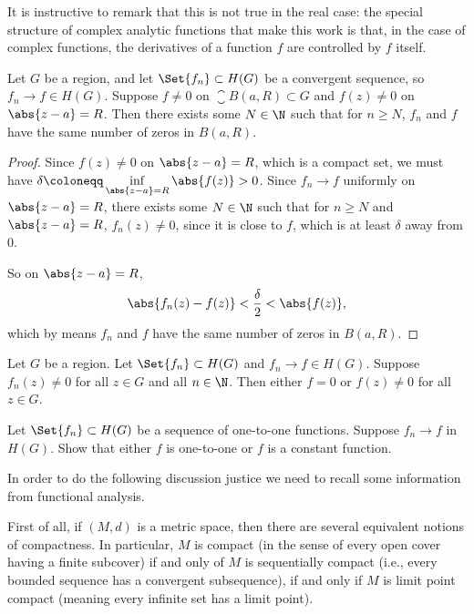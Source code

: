 It is instructive to remark that this is not true in the real case: the special structure of complex analytic functions that make this work is that, in the case of complex functions, the derivatives of a function $f$ are controlled by $f$ itself.

\begin{theorem}\label{thm7.7}
	Let $G$ be a region, and let $\Set{f_n} \subset H(G)$ be a convergent sequence, so $f_n \to f \in H(G)$.
	Suppose $f \neq 0$ on $\closure{B(a, R)} \subset G$ and $f(z) \neq 0$ on $\abs{z - a} = R$.
	Then there exists some $N \in \N$ such that for $n \geq N$, $f_n$ and $f$ have the same number of zeros in $B(a, R)$.
\end{theorem}

\begin{proof}
	Since $f(z) \neq 0$ on $\abs{z - a} = R$, which is a compact set, we must have $\delta \coloneqq \inf\limits_{\abs{z - a} = R} \abs{f(z)} > 0$.
	Since $f_n \to f$ uniformly on $\abs{z - a} = R$, there exists some $N \in \N$ such that for $n \geq N$ and $\abs{z - a} = R$, $f_n(z) \neq 0$, since it is close to $f$, which is at least $\delta$ away from $0$.

	So on $\abs{z - a} = R$,
	\[
		\abs{f_n(z) - f(z)} < \frac{\delta}{2} < \abs{f(z)},
	\]
	which by  means $f_n$ and $f$ have the same number of zeros in $B(a, R)$.
\end{proof}

\begin{corollary}\label{cor7.8}
	Let $G$ be a region.
	Let $\Set{f_n} \subset H(G)$ and $f_n \to f \in H(G)$.
	Suppose $f_n(z) \neq 0$ for all $z \in G$ and all $n \in \N$.
	Then either $f = 0$ or $f(z) \neq 0$ for all $z \in G$.
\end{corollary}

\begin{exercise}
	Let $\Set{f_n} \subset H(G)$ be a sequence of one-to-one functions.
	Suppose $f_n \to f$ in $H(G)$.
	Show that either $f$ is one-to-one or $f$ is a constant function.
\end{exercise}


In order to do the following discussion justice we need to recall some information from functional analysis.

First of all, if $(M, d)$ is a metric space, then there are several equivalent notions of compactness.
In particular, $M$ is compact (in the sense of every open cover having a finite subcover) if and only of $M$ is sequentially compact (i.e., every bounded sequence has a convergent subsequence), if and only if $M$ is limit point compact (meaning every infinite set has a limit point).

